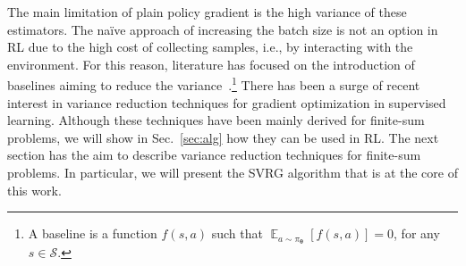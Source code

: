\documentclass{article}
\makeatletter
\theoremstyle{remark}
\theoremstyle{definition}
\DeclareRobustCommand{\eg}{e.g.,\@\xspace}
\DeclareRobustCommand{\ie}{i.e.,\@\xspace}
\DeclareMathOperator*{\EV}{\mathbb{E}}
\newcommand{\EVV}[2][\ppvect \in \ppspace]{\EV_{#1}\left[{#2}\right]}
\newcommand{\vtheta}{\boldsymbol{\theta}}
\newcommand{\Sspace}{\mathcal{S}}
\newcommand{\pol}{\pi_{\vtheta}}
\makeatother
\begin{document}
The main limitation of plain policy gradient is the high variance of these estimators.
The na\"ive approach of increasing the batch size is not an option in RL due to the high cost of collecting samples, \ie by interacting with the environment.
For this reason, literature has focused on the introduction of baselines aiming to reduce the variance~\citep[\eg][]{Peters2008reinf,Thomas2017actionbaseline,wu2018variance}.\footnote{A baseline is a function $f(s,a)$ such that $\EVV[a \sim \pol]{f(s,a)} = 0$, for any $s\in\Sspace$.}
There has been a surge of recent interest in variance reduction techniques for gradient optimization in supervised learning.
Although these techniques have been mainly derived for finite-sum problems, we will show in Sec.~\ref{sec:alg} how they can be used in RL.
The next section has the aim to describe variance reduction techniques for finite-sum problems. In particular, we will present the SVRG algorithm that is at the core of this work.
\end{document}
